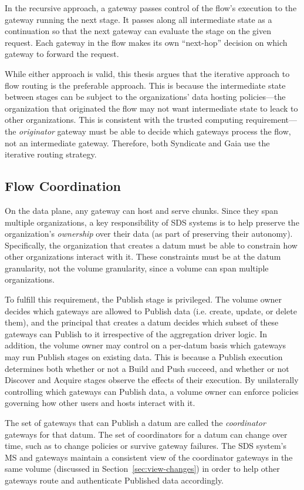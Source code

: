 In the recursive approach, a gateway passes control of the flow's execution
to the gateway running the next stage.  It passes along all intermediate
state as a continuation so that the next gateway can evaluate the stage on the
given request.  Each gateway in the flow makes its own
``next-hop'' decision on which gateway to forward the request.

While either approach is valid, this thesis argues that the iterative approach to flow
routing is the preferable approach.  This is because the intermediate state between
stages can be subject to the organizations' data hosting policies---the
organization that originated the flow may not want intermediate state to leack
to other organizations.  This is consistent with the trusted computing requirement---the
\emph{originator} gateway must be able
to decide which gateways process the flow, not an intermediate gateway.
Therefore, both Syndicate and Gaia use the iterative routing strategy.

\subsection{Flow Coordination}

On the data plane, any gateway can host and serve chunks.
Since they span multiple organizations, a key responsibility of SDS systems
is to help preserve the organization's \emph{ownership} over their data (as part
of preserving their autonomy).
Specifically, the organization that creates a datum
must be able to constrain how other organizations interact with it.  These
constraints must be at the datum granularity, not the volume granularity, since
a volume can span multiple organizations.

To fulfill this requirement, the Publish stage is privileged.  The volume owner decides
which gateways are allowed to Publish data (i.e. create, update, or delete
them), and the principal that creates a
datum decides which subset of these gateways can Publish to it irrespective of
the aggregation driver logic.  In addition, the volume owner may control on a
per-datum basis which gateways may run Publish stages on existing data.
This is because a Publish
execution determines both whether or not a Build and Push succeed, and
whether or not Discover and Acquire stages observe the effects of their
execution.  By unilaterally controlling which gateways can Publish data,
a volume owner can enforce policies governing how other
users and hosts interact with it.

The set of gateways that can Publish a datum are called the \emph{coordinator}
gateways for that datum.
The set of coordinators for a datum can change over time, such as to change
policies or survive gateway failures.  The SDS system's MS and gateways
maintain a consistent view of the coordinator gateways in the same volume
(discussed in Section~\ref{sec:view-changes}) in order to help other gateways
route and authenticate Published data accordingly.

